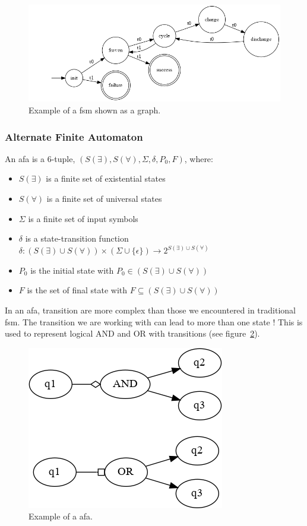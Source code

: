 \documentclass[12pt]{article}
\begin{document}
\begin{figure}
    \centering
    \includegraphics[scale=0.4]{graph/BatteryCycle.png}
    \caption{Example of a \gls{fsm} shown as a graph.}
    \label{battcycle}
\end{figure}

\subsubsection{Alternate Finite Automaton}

An \gls{afa} is a 6-tuple, $(S(\exists), S(\forall), \Sigma, \delta, P_0, F)$, where:

\begin{itemize}
\item $S(\exists)$ is a finite set of existential states
\item $S(\forall)$ is a finite set of universal states
\item $\Sigma$ is a finite set of input symbols
\item $\delta$ is a state-transition function $\delta: (S(\exists) \cup S(\forall)) \times (\Sigma \cup \{ \epsilon \}) \rightarrow 2^{S(\exists) \cup S(\forall)}$
\item $P_0$ is the initial state with $P_0 \in (S(\exists) \cup S(\forall))$
\item $F$ is the set of final state with $F \subseteq (S(\exists) \cup S(\forall))$
\end{itemize}

In an \gls{afa}, transition are more complex than those we encountered in traditional \gls{fsm}. The transition we are working with can lead to more than one state ! This is used to represent logical AND and OR with transitions (see figure~\ref{afa}).\\

\begin{figure}
    \centering
    \includegraphics[scale=0.8]{graph/afa.png}
    \caption{Example of a \gls{afa}.}
    \label{afa}
\end{figure}
\end{document}
